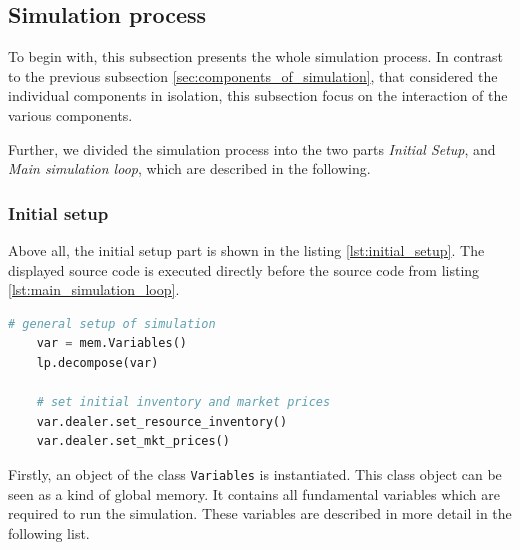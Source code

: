 \subsection{Simulation process}
To begin with, this subsection presents the whole simulation process. 
In contrast to the previous subsection \ref{sec:components_of_simulation}, that 
considered the individual components in isolation, this subsection focus 
on the interaction of the various components.

Further, we divided the simulation process into 
the two parts \textit{Initial Setup}, and \textit{Main simulation loop},
which are described in the following.

\subsubsection{Initial setup}
Above all, the initial setup part is shown in the listing \ref{lst:initial_setup}.
The displayed source code is executed directly before the source code from listing \ref{lst:main_simulation_loop}.

\begin{lstlisting}[float=htbp, label=lst:initial_setup, caption=Initial setup of the simulation, language=Python]
    # general setup of simulation
    var = mem.Variables()
    lp.decompose(var)

    # set initial inventory and market prices
    var.dealer.set_resource_inventory()
    var.dealer.set_mkt_prices()  
\end{lstlisting}

Firstly, an object of the class \verb|Variables| is instantiated. 
This class object can be seen as a kind of global memory.
It contains all fundamental variables which are required to run the simulation.
These variables are described in more detail in the following list.

